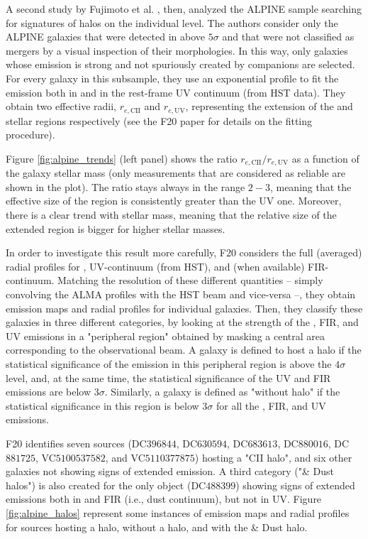 A second study by Fujimoto et al. \citep[][hereafter F20]{Fujimoto:2020qzo}, then, analyzed the ALPINE sample searching for signatures of \CII halos on the individual level. The authors consider only the ALPINE galaxies that were detected in \CII above $5\sigma$ and that were not classified as mergers by a visual inspection of their morphologies. In this way, only galaxies whose \CII emission is strong and not spuriously created by companions are selected. For every galaxy in this subsample, they use an exponential profile to fit the emission both in \CII and in the rest-frame UV continuum (from HST data). They obtain two effective radii, $r_{e,\mathrm{CII}}$ and $r_{e,\mathrm{UV}}$, representing the extension of the \CII and stellar regions respectively (see the F20 paper \citep{Fujimoto:2020qzo} for details on the fitting procedure). 

Figure \ref{fig:alpine_trends} (left panel) shows the ratio $r_{e,\mathrm{CII}} / r_{e,\mathrm{UV}}$ as a function of the galaxy stellar mass (only measurements that are considered as reliable are shown in the plot). The ratio stays always in the range $2-3$, meaning that the effective size of the \CII region is consistently greater than the UV one. Moreover, there is a clear trend with stellar mass, meaning that the relative size of the \CII extended region is bigger for higher stellar masses. 

In order to investigate this result more carefully, F20 considers the full (averaged) radial profiles for \CII, UV-continuum (from HST), and (when available) FIR-continuum. Matching the resolution of these different quantities -- simply convolving the ALMA profiles with the HST beam and vice-versa --, they obtain emission maps and radial profiles for individual galaxies. Then, they classify these galaxies in three different categories, by looking at the strength of the \CII, FIR, and UV emissions in a "peripheral region" obtained by masking a central area corresponding to the observational beam. A galaxy is defined to host a \CII halo if the statistical significance of the \CII emission in this peripheral region is above the $4\sigma$ level, and, at the same time, the statistical significance of the UV and FIR emissions are below $3\sigma$. Similarly, a galaxy is defined as "without \CII halo" if the statistical significance in this region is below $3\sigma$ for all the \CII, FIR, and UV emissions. 

F20 identifies seven sources (DC$396844$, DC$630594$, DC$683613$, DC$880016$, DC$881725$, VC$5100537582$, and VC$5110377875$) hosting a "CII halo", and six other galaxies not showing signs of extended \CII emission. A third category ("\CII \& Dust halos") is also created for the only object (DC$488399$) showing signs of extended emissions both in \CII and FIR (i.e., dust continuum), but not in UV. Figure \ref{fig:alpine_halos} represent some instances of emission maps and radial profiles for sources hosting a \CII halo, without a \CII halo, and with the \CII \& Dust halo. 

